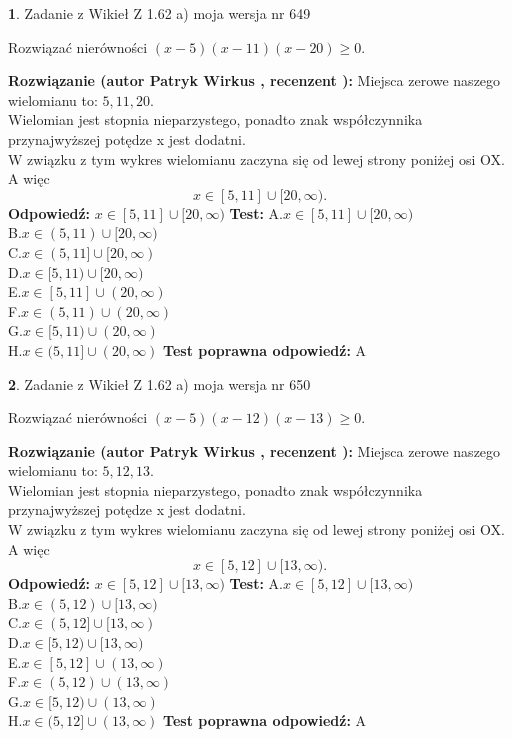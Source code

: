 \documentclass[12pt, a4paper]{article}
\theoremstyle{definition} %
\newtheorem{zad}{}
\newcommand{\zadStart}[1]{\begin{zad}#1\newline}
\newcommand{\zadStop}{\end{zad}}
\newcommand{\rozwStart}[2]{\noindent \textbf{Rozwiązanie (autor #1 , recenzent #2): }\newline}
\newcommand{\rozwStop}{\newline}
\newcommand{\odpStart}{\noindent \textbf{Odpowiedź:}\newline}
\newcommand{\odpStop}{\newline}
\newcommand{\testStart}{\noindent \textbf{Test:}\newline}
\newcommand{\testStop}{\newline}
\newcommand{\kluczStart}{\noindent \textbf{Test poprawna odpowiedź:}\newline}
\newcommand{\kluczStop}{\newline}
\begin{document}
\zadStart{Zadanie z Wikieł Z 1.62 a) moja wersja nr 649}

Rozwiązać nierówności $(x-5)(x-11)(x-20)\ge0$.
\zadStop
\rozwStart{Patryk Wirkus}{}
Miejsca zerowe naszego wielomianu to: $5, 11, 20$.\\
Wielomian jest stopnia nieparzystego, ponadto znak współczynnika przy\linebreak najwyższej potędze x jest dodatni.\\ W związku z tym wykres wielomianu zaczyna się od lewej strony poniżej osi OX. A więc $$x \in [5,11] \cup [20,\infty).$$
\rozwStop
\odpStart
$x \in [5,11] \cup [20,\infty)$
\odpStop
\testStart
A.$x \in [5,11] \cup [20,\infty)$\\
B.$x \in (5,11) \cup [20,\infty)$\\
C.$x \in (5,11] \cup [20,\infty)$\\
D.$x \in [5,11) \cup [20,\infty)$\\
E.$x \in [5,11] \cup (20,\infty)$\\
F.$x \in (5,11) \cup (20,\infty)$\\
G.$x \in [5,11) \cup (20,\infty)$\\
H.$x \in (5,11] \cup (20,\infty)$
\testStop
\kluczStart
A
\kluczStop



\zadStart{Zadanie z Wikieł Z 1.62 a) moja wersja nr 650}

Rozwiązać nierówności $(x-5)(x-12)(x-13)\ge0$.
\zadStop
\rozwStart{Patryk Wirkus}{}
Miejsca zerowe naszego wielomianu to: $5, 12, 13$.\\
Wielomian jest stopnia nieparzystego, ponadto znak współczynnika przy\linebreak najwyższej potędze x jest dodatni.\\ W związku z tym wykres wielomianu zaczyna się od lewej strony poniżej osi OX. A więc $$x \in [5,12] \cup [13,\infty).$$
\rozwStop
\odpStart
$x \in [5,12] \cup [13,\infty)$
\odpStop
\testStart
A.$x \in [5,12] \cup [13,\infty)$\\
B.$x \in (5,12) \cup [13,\infty)$\\
C.$x \in (5,12] \cup [13,\infty)$\\
D.$x \in [5,12) \cup [13,\infty)$\\
E.$x \in [5,12] \cup (13,\infty)$\\
F.$x \in (5,12) \cup (13,\infty)$\\
G.$x \in [5,12) \cup (13,\infty)$\\
H.$x \in (5,12] \cup (13,\infty)$
\testStop
\kluczStart
A
\kluczStop
\end{document}
